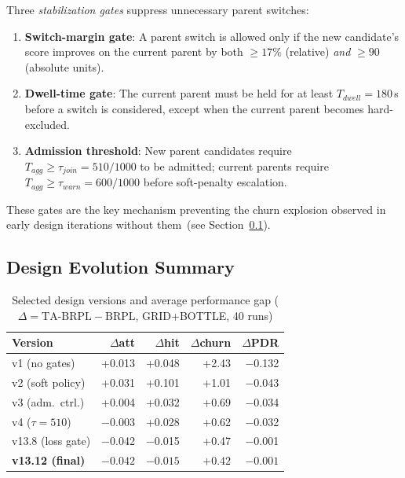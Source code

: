 \documentclass[conference]{IEEEtran}
\begin{document}
Three \emph{stabilization gates} suppress unnecessary parent switches:
\begin{enumerate}
\item \textbf{Switch-margin gate}: A parent switch is allowed only if the
  new candidate's score improves on the current parent by both
  $\geq 17\%$ (relative) \emph{and} $\geq 90$ (absolute units).
\item \textbf{Dwell-time gate}: The current parent must be held for at least
  $T_{dwell} = 180$\,s before a switch is considered,
  except when the current parent becomes hard-excluded.
\item \textbf{Admission threshold}: New parent candidates require
  $T_{agg} \geq \tau_{join} = 510/1000$ to be admitted;
  current parents require $T_{agg} \geq \tau_{warn} = 600/1000$
  before soft-penalty escalation.
\end{enumerate}

These gates are the key mechanism preventing the churn explosion
observed in early design iterations without them~(see Section~\ref{sec:design_history}).

\subsection{Design Evolution Summary}
\label{sec:design_history}

\begin{table}[t]
\centering
\caption{Selected design versions and average performance gap
  ($\Delta = \text{TA-BRPL} - \text{BRPL}$, GRID+BOTTLE, 40 runs)}
\label{tab:versions}
\footnotesize
\begin{tabular}{lrrrr}
\toprule
Version & $\Delta$att & $\Delta$hit & $\Delta$churn & $\Delta$PDR \\
\midrule
v1 (no gates)       & +0.013 & +0.048 & +2.43 & $-$0.132 \\
v2 (soft policy)    & +0.031 & +0.101 & +1.01 & $-$0.043 \\
v3 (adm.\ ctrl.)    & +0.004 & +0.032 & +0.69 & $-$0.034 \\
v4 ($\tau{=}510$)   & $-$0.003 & +0.028 & +0.62 & $-$0.032 \\
v13.8 (loss gate)   & $-$0.042 & $-$0.015 & +0.47 & $-$0.001 \\
\textbf{v13.12 (final)}& $\mathbf{-0.042}$ & $\mathbf{-0.015}$ & $\mathbf{+0.42}$ & $\mathbf{-0.001}$ \\
\bottomrule
\end{tabular}
\end{table}
\end{document}
